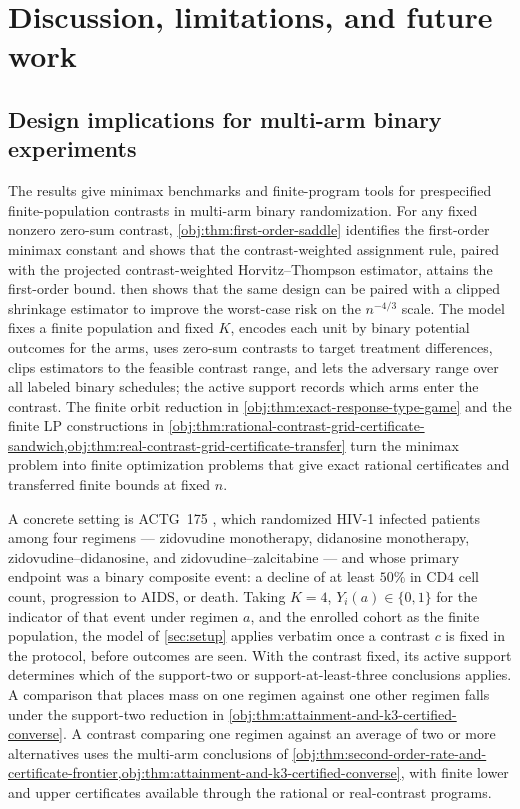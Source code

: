 \section{Discussion, limitations, and future work}\label{sec:discussion}

\subsection{Design implications for multi-arm binary experiments}

The results give minimax benchmarks and finite-program tools for prespecified finite-population contrasts in multi-arm binary randomization. For any fixed nonzero zero-sum contrast, \cref{obj:thm:first-order-saddle} identifies the first-order minimax constant and shows that the contrast-weighted assignment rule, paired with the projected contrast-weighted Horvitz--Thompson estimator, attains the first-order bound.  then shows that the same design can be paired with a clipped shrinkage estimator to improve the worst-case risk on the \(n^{-4/3}\) scale. The model fixes a finite population and fixed \(K\), encodes each unit by binary potential outcomes for the arms, uses zero-sum contrasts to target treatment differences, clips estimators to the feasible contrast range, and lets the adversary range over all labeled binary schedules; the active support records which arms enter the contrast. The finite orbit reduction in \cref{obj:thm:exact-response-type-game} and the finite LP constructions in \cref{obj:thm:rational-contrast-grid-certificate-sandwich,obj:thm:real-contrast-grid-certificate-transfer} turn the minimax problem into finite optimization problems that give exact rational certificates and transferred finite bounds at fixed \(n\).

A concrete setting is ACTG~175 \citep{hammer_et_al_1996_actg175}, which randomized HIV-1 infected patients among four regimens --- zidovudine monotherapy, didanosine monotherapy, zidovudine--didanosine, and zidovudine--zalcitabine --- and whose primary endpoint was a binary composite event: a decline of at least \(50\%\) in CD4 cell count, progression to AIDS, or death. Taking \(K=4\), \(Y_i(a)\in\{0,1\}\) for the indicator of that event under regimen \(a\), and the enrolled cohort as the finite population, the model of \cref{sec:setup} applies verbatim once a contrast \(c\) is fixed in the protocol, before outcomes are seen. With the contrast fixed, its active support determines which of the support-two or support-at-least-three conclusions applies. A comparison that places mass on one regimen against one other regimen falls under the support-two reduction in \cref{obj:thm:attainment-and-k3-certified-converse}. A contrast comparing one regimen against an average of two or more alternatives uses the multi-arm conclusions of \cref{obj:thm:second-order-rate-and-certificate-frontier,obj:thm:attainment-and-k3-certified-converse}, with finite lower and upper certificates available through the rational or real-contrast programs.

